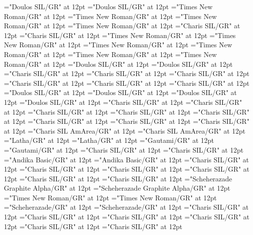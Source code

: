 \documentclass[a4paper]{article}
\begin{document}
\font\divqaafonipaxyii="Doulos SIL/GR" at 12pt
\font\spanqaafonipaxyii="Doulos SIL/GR" at 12pt
\font\divqaaxfwt="Times New Roman/GR" at 12pt
\font\spanqaaxfwt="Times New Roman/GR" at 12pt
\font\divqaaxgot="Times New Roman/GR" at 12pt
\font\spanqaaxgot="Times New Roman/GR" at 12pt
\font\divqaaxkal="Charis SIL/GR" at 12pt
\font\spanqaaxkal="Charis SIL/GR" at 12pt
\font\divqaaxlel="Times New Roman/GR" at 12pt
\font\spanqaaxlel="Times New Roman/GR" at 12pt
\font\divqaaxpig="Times New Roman/GR" at 12pt
\font\spanqaaxpig="Times New Roman/GR" at 12pt
\font\divqaaxsim="Times New Roman/GR" at 12pt
\font\spanqaaxsim="Times New Roman/GR" at 12pt
\font\divqaaxsta="Doulos SIL/GR" at 12pt
\font\spanqaaxsta="Doulos SIL/GR" at 12pt
\font\divqaaZxxxxkalAUDIO="Charis SIL/GR" at 12pt
\font\spanqaaZxxxxkalAUDIO="Charis SIL/GR" at 12pt
\font\divro="Charis SIL/GR" at 12pt
\font\spanro="Charis SIL/GR" at 12pt
\font\divru="Charis SIL/GR" at 12pt
\font\spanru="Charis SIL/GR" at 12pt
\font\divsehfonipaxetic="Doulos SIL/GR" at 12pt
\font\spansehfonipaxetic="Doulos SIL/GR" at 12pt
\font\divsehfonipa="Doulos SIL/GR" at 12pt
\font\spansehfonipa="Doulos SIL/GR" at 12pt
\font\divsehZxxxxaudio="Charis SIL/GR" at 12pt
\font\spansehZxxxxaudio="Charis SIL/GR" at 12pt
\font\divseh="Charis SIL/GR" at 12pt
\font\spanseh="Charis SIL/GR" at 12pt
\font\divshhZxxxxaudio="Charis SIL/GR" at 12pt
\font\spanshhZxxxxaudio="Charis SIL/GR" at 12pt
\font\divshh="Charis SIL/GR" at 12pt
\font\spanshh="Charis SIL/GR" at 12pt
\font\divstp="Charis SIL AmArea/GR" at 12pt
\font\spanstp="Charis SIL AmArea/GR" at 12pt
\font\divta="Latha/GR" at 12pt
\font\spanta="Latha/GR" at 12pt
\font\divte="Gautami/GR" at 12pt
\font\spante="Gautami/GR" at 12pt
\font\divth="Charis SIL/GR" at 12pt
\font\spanth="Charis SIL/GR" at 12pt
\font\divtpi="Andika Basic/GR" at 12pt
\font\spantpi="Andika Basic/GR" at 12pt
\font\divtrfonipaxemic="Charis SIL/GR" at 12pt
\font\spantrfonipaxemic="Charis SIL/GR" at 12pt
\font\divtrfonipa="Charis SIL/GR" at 12pt
\font\spantrfonipa="Charis SIL/GR" at 12pt
\font\divtr="Charis SIL/GR" at 12pt
\font\spantr="Charis SIL/GR" at 12pt
\font\divurArab="Scheherazade Graphite Alpha/GR" at 12pt
\font\spanurArab="Scheherazade Graphite Alpha/GR" at 12pt
\font\divurxind="Times New Roman/GR" at 12pt
\font\spanurxind="Times New Roman/GR" at 12pt
\font\divur="Scheherazade/GR" at 12pt
\font\spanur="Scheherazade/GR" at 12pt
\font\divvi="Charis SIL/GR" at 12pt
\font\spanvi="Charis SIL/GR" at 12pt
\font\divxas="Charis SIL/GR" at 12pt
\font\spanxas="Charis SIL/GR" at 12pt
\font\divzhCNpinyin="Charis SIL/GR" at 12pt
\font\spanzhCNpinyin="Charis SIL/GR" at 12pt
\end{document}
